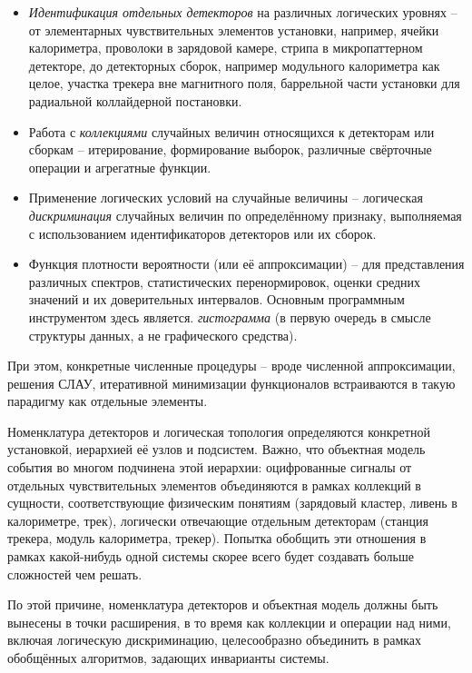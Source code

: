 \begin{itemize}
    \item  \emph{Идентификация отдельных детекторов} на различных
    логических уровнях -- от элементарных чувствительных элементов
    установки, например, ячейки калориметра, проволоки в зарядовой камере,
    стрипа в микропаттерном детекторе, до детекторных сборок, например
    модульного калориметра как целое, участка трекера вне магнитного
    поля, баррельной части установки для радиальной коллайдерной
    постановки.
    \item Работа с \emph{коллекциями} случайных величин относящихся к
    детекторам или сборкам -- итерирование, формирование выборок,
    различные свёрточные операции и агрегатные функции.
    \item Применение логических условий на случайные величины --
    логическая \emph{дискриминация} случайных величин по определённому
    признаку, выполняемая с использованием идентификаторов детекторов
    или их сборок.
    \item Функция плотности вероятности (или её аппроксимации) --
    для представления различных спектров, статистических
    перенормировок, оценки средних значений и их доверительных
    интервалов. Основным программным инструментом здесь является.
    \emph{гистограмма} (в первую очередь в смысле структуры данных,
    а не графического средства).
\end{itemize}

При этом, конкретные численные процедуры -- вроде численной аппроксимации,
решения СЛАУ, итеративной минимизации функционалов встраиваются в такую
парадигму как отдельные элементы.

Номенклатура детекторов и логическая топология определяются
конкретной установкой, иерархией её узлов и подсистем. Важно, что
объектная модель события во многом подчинена этой иерархии:
оцифрованные сигналы от отдельных чувствительных элементов
объединяются в рамках коллекций в сущности, соответствующие
физическим понятиям (зарядовый кластер, ливень в калориметре,
трек), логически отвечающие отдельным детекторам (станция трекера,
модуль калориметра, трекер). Попытка обобщить эти отношения в рамках
какой-нибудь одной системы скорее всего будет создавать больше сложностей
чем решать.

По этой причине, номенклатура детекторов и объектная модель должны
быть вынесены в точки расширения, в то время как коллекции и операции над
ними, включая логическую дискриминацию, целесообразно объединить в
рамках обобщённых алгоритмов, задающих инварианты системы.
